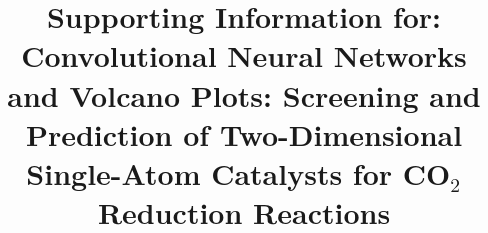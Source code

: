 \title{Supporting Information for:  \\
Convolutional Neural Networks and Volcano Plots:
Screening and Prediction of Two-Dimensional Single-Atom Catalysts for CO$_2$ Reduction Reactions}


\author{}  %


\maketitle
